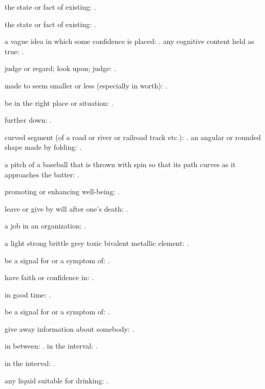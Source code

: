   the state or fact of existing: .

  the state or fact of existing: .

  a vague idea in which some confidence is placed: . any cognitive content held as true: .

  judge or regard; look upon; judge: .

  made to seem smaller or less (especially in worth): .

  be in the right place or situation: .

  further down: .

  curved segment (of a road or river or railroad track etc.): . an angular or rounded shape made by folding: .

  a pitch of a baseball that is thrown with spin so that its path curves as it approaches the batter: .

  promoting or enhancing well-being: .

  leave or give by will after one's death: .

  a job in an organization: .

  a light strong brittle grey toxic bivalent metallic element: .

  be a signal for or a symptom of: .

  have faith or confidence in: .

  in good time: .

  be a signal for or a symptom of: .

  give away information about somebody: .

  in between: . in the interval: .

  in the interval: .

  any liquid suitable for drinking: .

